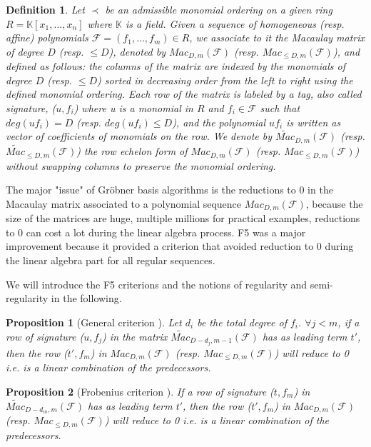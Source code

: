 \documentclass[english]{article}
\newtheorem{proposition}{Proposition}[section]
\newtheorem{definition}{Definition}[section]
\newcommand{\Mac}[3]{{Mac_{#1, #2}(\mathcal{#3})}}
\newcommand{\Mact}[3]{{\widetilde{Mac}_{#1, #2}(\mathcal{#3})}}
\begin{document}
		\begin{definition}
			Let $\prec$ be an admissible monomial ordering on a given ring $R = \mathbb{K}[x_1,\dots,x_n]$ where $\mathbb{K}$ is a field. Given a sequence of homogeneous (resp. affine) polynomials $\mathcal{F} = (f_1,\dots,f_m) \in R$, we associate to it the Macaulay matrix of degree $D$ (resp. $\leq D$), denoted by $\Mac{D}{m}{\mathcal{F}}$ (resp. $\Mac{\leq D}{m}{\mathcal{F}}$), and defined as follows: the columns of the matrix are indexed by the monomials of degree $D$ (resp. $\leq D$) sorted in decreasing order from the left to right using the defined monomial ordering. Each row of the matrix is labeled by a tag, also called signature, ($u, f_i$) where u is a monomial in $R$ and $f_i \in \mathcal{F}$ such that $deg(uf_i) = D$ (resp. $deg(uf_i) \leq D$), and the polynomial $uf_i$ is written as vector of coefficients of monomials on the row. We denote by $\Mact{D}{m}{F}$ (resp. $\Mact{\leq D}{m}{F}$) the row echelon form of $\Mac{D}{m}{\mathcal{F}}$ (resp. $\Mac{\leq D}{m}{\mathcal{F}}$) without swapping columns to preserve the monomial ordering.
		\end{definition}
		
		The major "issue" of Gröbner basis algorithms is the reductions to 0 in the Macaulay matrix associated to a polynomial sequence $\Mac{D}{m}{F}$, because the size of the matrices are huge, multiple millions for practical examples,
		reductions to 0 can cost a lot during the linear algebra process. F5 \cite{F02} was a major improvement because it provided a criterion that avoided reduction to 0 during the linear algebra part for all regular sequences.
		
		We will introduce the F5 criterions and the notions of regularity and semi-regularity in the following.
		
		\begin{proposition}[General criterion \cite{F02}]
			\label{F5Crit}
			Let $d_i$ be the total degree of $f_i$.
			$\forall j < m$, if a row of signature ($u, f_j$) in the matrix $\Mact{D-d_j}{m-1}{F}$ has as leading term $t'$, then the row ($t', f_m$) in $\Mac{D}{m}{F}$ (resp. $\Mac{\leq D}{m}{F}$) will reduce to 0 i.e. is a linear combination of the predecessors.
		\end{proposition}
		
		\begin{proposition}[Frobenius criterion \cite{F02}]
			\label{Frob}
			If a row of signature ($t, f_m$) in $\Mact{D - d_m}{m}{F}$ has as leading term $t'$, then the row ($t', f_m$) in $\Mac{D}{m}{F}$ (resp. $\Mac{\leq D}{m}{F}$) will reduce to 0 i.e. is a linear combination of the predecessors.
		\end{proposition}
		
\end{document}
